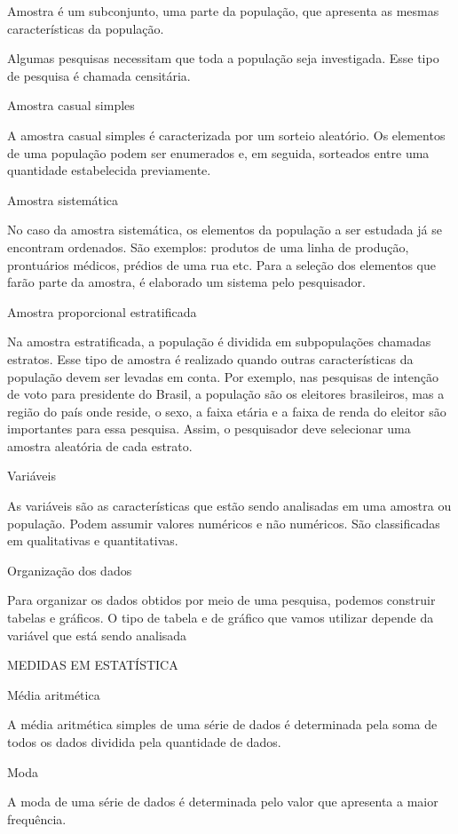 Amostra é um subconjunto, uma parte da população, que apresenta as
mesmas características da população.

Algumas pesquisas necessitam que toda a população seja investigada. Esse
tipo de pesquisa é chamada censitária.

Amostra casual simples

A amostra casual simples é caracterizada por um sorteio aleatório. Os
elementos de uma população podem ser enumerados e, em seguida, sorteados
entre uma quantidade estabelecida previamente.

Amostra sistemática

No caso da amostra sistemática, os elementos da população a ser estudada
já se encontram ordenados. São exemplos: produtos de uma linha de
produção, prontuários médicos, prédios de uma rua etc. Para a seleção
dos elementos que farão parte da amostra, é elaborado um sistema pelo
pesquisador.

Amostra proporcional estratificada

Na amostra estratificada, a população é dividida em subpopulações
chamadas estratos. Esse tipo de amostra é realizado quando outras
características da população devem ser levadas em conta. Por exemplo,
nas pesquisas de intenção de voto para presidente do Brasil, a população
são os eleitores brasileiros, mas a região do país onde reside, o sexo,
a faixa etária e a faixa de renda do eleitor são importantes para essa
pesquisa. Assim, o pesquisador deve selecionar uma amostra aleatória de
cada estrato.

Variáveis

As variáveis são as características que estão sendo analisadas em uma
amostra ou população. Podem assumir valores numéricos e não numéricos.
São classificadas em qualitativas e quantitativas.

Organização dos dados

Para organizar os dados obtidos por meio de uma pesquisa, podemos
construir tabelas e gráficos. O tipo de tabela e de gráfico que vamos
utilizar depende da variável que está sendo analisada

MEDIDAS EM ESTATÍSTICA

Média aritmética

A média aritmética simples de uma série de dados é determinada pela soma
de todos os dados dividida pela quantidade de dados.

Moda

A moda de uma série de dados é determinada pelo valor que apresenta a
maior frequência.

